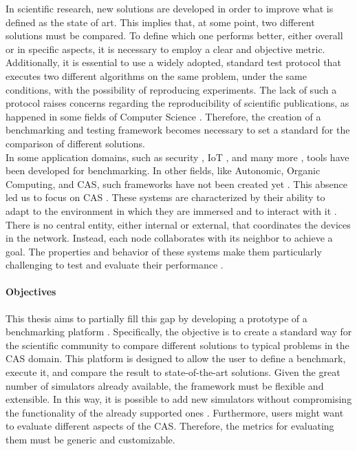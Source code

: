 \documentclass[12pt,a4paper,openright,twoside]{book}
\begin{document}
In scientific research, new solutions are developed in order to improve what is defined as the state of art. 
This implies that, at some point, two different solutions must be compared.
To define which one performs better, either overall or in specific aspects, it is necessary to employ a clear and objective metric. 
Additionally, it is essential to use a widely adopted, standard test protocol that executes two different algorithms on the same problem, under the same conditions, with the possibility of reproducing experiments. 
The lack of such a protocol raises concerns regarding the reproducibility of scientific publications, as happened in some fields of Computer Science \cite{DBLP:journals/cacm/CollbergP16, DBLP:conf/aaai/GundersenK18}.
Therefore, the creation of a benchmarking and testing framework becomes necessary to set a standard for the comparison of different solutions. \\

In some application domains, such as security \cite{DBLP:conf/bdet/Es-SamaaliOBMK21}, IoT \cite{DBLP:conf/IEEEares/RuckGWLN23}, and many more \cite{DBLP:journals/ral/CollinsRYSJP24, DBLP:journals/corr/abs-2401-01275}, tools have been developed for benchmarking. 
In other fields, like Autonomic, Organic Computing, and \ac*{CAS}, such frameworks have not been created yet \cite{DBLP:conf/icac/BrownHHLLSY04, DBLP:conf/autonomics/EtcheversCV09}.
This absence led us to focus on \ac*{CAS} \cite{DBLP:journals/sttt/NicolaJW20}. 
These systems are characterized by their ability to adapt to the environment in which they are immersed and to interact with it \cite{DBLP:conf/birthday/BucchiaroneM19}.
There is no central entity, either internal or external, that coordinates the devices in the network. Instead, each node collaborates with its neighbor to achieve a goal.
The properties and behavior of these systems make them particularly challenging to test and evaluate their performance \cite{DBLP:conf/srds/AlmeidaMV10}.

\paragraph{Objectives}
This thesis aims to partially fill this gap by developing a prototype of a benchmarking platform \cite{DBLP:conf/cisis/VilenicaL12, DBLP:conf/atal/ZhangZWBR20}.
Specifically, the objective is to create a standard way for the scientific community to compare different solutions to typical problems in the \ac*{CAS} domain.
This platform is designed to allow the user to define a benchmark, execute it, and compare the result to state-of-the-art solutions.
Given the great number of simulators already available, the framework must be flexible and extensible.
In this way, it is possible to add new simulators without compromising the functionality of the already supported ones \cite{DBLP:conf/mascots/Dujmovic99}.
Furthermore, users might want to evaluate different aspects of the \ac*{CAS}. Therefore, the metrics for evaluating them must be generic and customizable.
\end{document}
